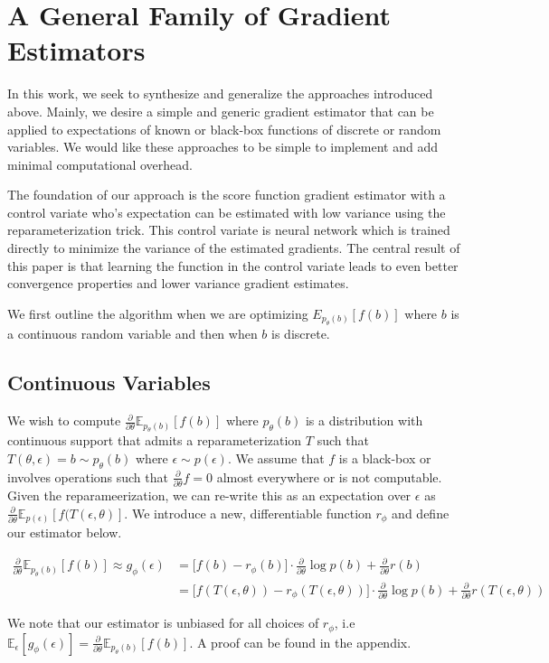 \documentclass{article}
\newcommand{\E}{\mathbb{E}}
\newcommand{\PT}{\frac{\partial}{\partial \theta}}
\newcommand{\LP}[1]{\PT \log p(#1)}
\begin{document}
\section{A General Family of Gradient Estimators}
In this work, we seek to synthesize and generalize the approaches introduced above. Mainly, we desire a simple and generic gradient estimator that can be applied to expectations of known or black-box functions of discrete or random variables. We would like these approaches to be simple to implement and add minimal computational overhead. 

The foundation of our approach is the score function gradient estimator with a control variate who's expectation can be estimated with low variance using the reparameterization trick. This control variate is neural network which is trained directly to minimize the variance of the estimated gradients. The central result of this paper is that learning the function in the control variate leads to even better convergence properties and lower variance gradient estimates. 

We first outline the algorithm when we are optimizing $E_{p_\theta(b)}[f(b)]$ where $b$ is a continuous random variable and then when $b$ is discrete.

\subsection{Continuous Variables}
We wish to compute $\PT\E_{p_\theta(b)}[f(b)]$ where $p_\theta(b)$ is a distribution with continuous support that admits a reparameterization $T$ such that $T(\theta, \epsilon) = b \sim p_\theta(b)$ where $\epsilon \sim p(\epsilon)$. We assume that $f$ is a black-box or involves operations such that $\PT f = 0$ almost everywhere or is not computable.  Given the reparameerization, we can re-write this as an expectation over $\epsilon$ as  $\PT\E_{p(\epsilon)}[f(T(\epsilon, \theta)]$. We introduce a new, differentiable function $r_\phi$ and define our estimator below.

\begin{align}
\PT\E_{p_\theta(b)}[f(b)] \approx g_\phi(\epsilon) &= \Big[f(b) - r_\phi(b)\Big]\cdot\LP{b} + \PT r(b)\\
&= \Big[f(T(\epsilon, \theta)) - r_\phi(T(\epsilon, \theta))\Big]\cdot\LP{b} + \PT r(T(\epsilon, \theta))
\end{align}

We note that our estimator is unbiased for all choices of $r_\phi$, i.e $\E_\epsilon[g_\phi(\epsilon)] = \PT\E_{p_\theta(b)}[f(b)]$. A proof can be found in the appendix. 
\end{document}
